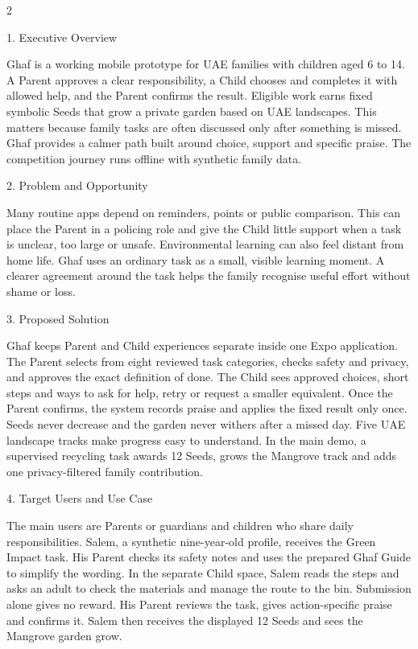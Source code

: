 \documentclass[11pt,a4paper]{article}
\newcommand{\briefsection}[2]{%
  \vspace{1.5pt}%
  {\displayfont\fontsize{10.8}{12.4}\selectfont\color{Ghaf}#1. #2}\par
  \vspace{0.3pt}%
}
\begin{document}
\vspace{1.2mm}
\begin{multicols}{2}

\briefsection{1}{Executive Overview}
Ghaf is a working mobile prototype for UAE families with children aged 6 to 14. A Parent approves a clear responsibility, a Child chooses and completes it with allowed help, and the Parent confirms the result. Eligible work earns fixed symbolic Seeds that grow a private garden based on UAE landscapes. This matters because family tasks are often discussed only after something is missed. Ghaf provides a calmer path built around choice, support and specific praise. The competition journey runs offline with synthetic family data.

\briefsection{2}{Problem and Opportunity}
Many routine apps depend on reminders, points or public comparison. This can place the Parent in a policing role and give the Child little support when a task is unclear, too large or unsafe. Environmental learning can also feel distant from home life. Ghaf uses an ordinary task as a small, visible learning moment. A clearer agreement around the task helps the family recognise useful effort without shame or loss.

\briefsection{3}{Proposed Solution}
Ghaf keeps Parent and Child experiences separate inside one Expo application. The Parent selects from eight reviewed task categories, checks safety and privacy, and approves the exact definition of done. The Child sees approved choices, short steps and ways to ask for help, retry or request a smaller equivalent. Once the Parent confirms, the system records praise and applies the fixed result only once. Seeds never decrease and the garden never withers after a missed day. Five UAE landscape tracks make progress easy to understand. In the main demo, a supervised recycling task awards 12 Seeds, grows the Mangrove track and adds one privacy-filtered family contribution.

\briefsection{4}{Target Users and Use Case}
The main users are Parents or guardians and children who share daily responsibilities. Salem, a synthetic nine-year-old profile, receives the Green Impact task. His Parent checks its safety notes and uses the prepared Ghaf Guide to simplify the wording. In the separate Child space, Salem reads the steps and asks an adult to check the materials and manage the route to the bin. Submission alone gives no reward. His Parent reviews the task, gives action-specific praise and confirms it. Salem then receives the displayed 12 Seeds and sees the Mangrove garden grow.


\end{multicols}
\end{document}
